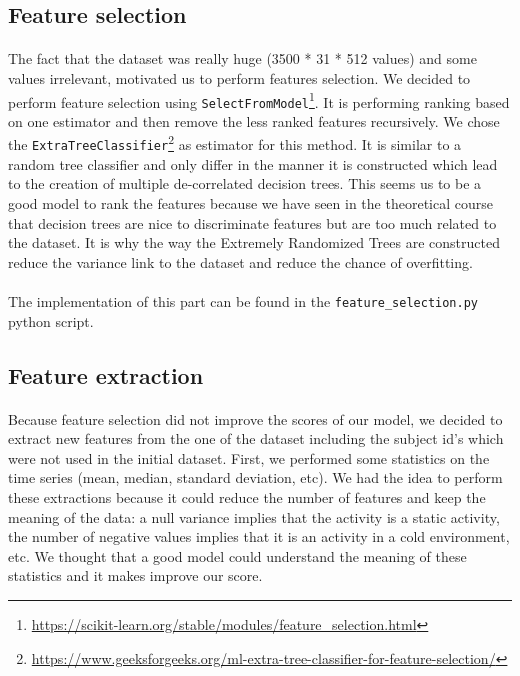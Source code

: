 \documentclass[a4paper, 11pt, oneside]{article}
\begin{document}
\subsection{Feature selection}
\paragraph{}The fact that the dataset was really huge (3500 * 31 * 512 values) and some values irrelevant, motivated us to perform features selection. We decided to perform feature selection using \texttt{SelectFromModel}\footnote{\url{https://scikit-learn.org/stable/modules/feature_selection.html}}. It is performing ranking based on one estimator and then remove the less ranked features recursively. We chose the \texttt{ExtraTreeClassifier}\footnote{\url{https://www.geeksforgeeks.org/ml-extra-tree-classifier-for-feature-selection/}} as estimator for this method. It is similar to a random tree classifier and only differ in the manner it is constructed which lead to the creation of multiple de-correlated decision trees. This seems us to be a good model to rank the features because we have seen in the theoretical course that decision trees are nice to discriminate features but are too much related to the dataset. It is why the way the Extremely Randomized Trees are constructed reduce the variance link to the dataset and reduce the chance of overfitting.

\paragraph{}The implementation of this part can be found in the \texttt{feature\_selection.py} python script. 

\subsection{Feature extraction} \label{sec:feature_ex}
\paragraph{}Because feature selection did not improve the scores of our model, we decided to extract new features from the one of the dataset including the subject id's which were not used in the initial dataset. First, we performed some statistics on the time series (mean, median, standard deviation, etc). 
We had the idea to perform these extractions because it could reduce the number of features and keep the meaning of the data: a null variance implies that the activity is a static activity, the number of negative values implies that it is an activity in a cold environment, etc.
We thought that a good model could understand the meaning of these statistics and it makes improve our score. 
\end{document}
